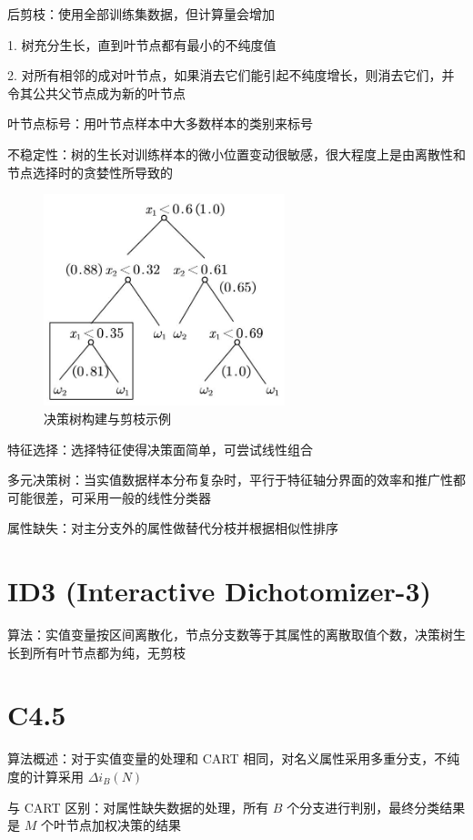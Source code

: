 \documentclass[openany]{ctexbook}
\theoremstyle{kaiti}
\theoremstyle{normal}
\begin{document}
后剪枝：使用全部训练集数据，但计算量会增加

1. 树充分生长，直到叶节点都有最小的不纯度值

2. 对所有相邻的成对叶节点，如果消去它们能引起不纯度增长，则消去它们，并令其公共父节点成为新的叶节点

叶节点标号：用叶节点样本中大多数样本的类别来标号

不稳定性：树的生长对训练样本的微小位置变动很敏感，很大程度上是由离散性和节点选择时的贪婪性所导致的

\begin{figure}
  \centering
  \includegraphics[width=7cm]{1627808769097-11.2(1).jpg}
  \caption{决策树构建与剪枝示例}
\end{figure}

特征选择：选择特征使得决策面简单，可尝试线性组合

多元决策树：当实值数据样本分布复杂时，平行于特征轴分界面的效率和推广性都可能很差，可采用一般的线性分类器

属性缺失：对主分支外的属性做替代分枝并根据相似性排序

\section{ID3 (Interactive Dichotomizer-3)}

算法：实值变量按区间离散化，节点分支数等于其属性的离散取值个数，决策树生长到所有叶节点都为纯，无剪枝

\section{C4.5}

算法概述：对于实值变量的处理和 CART 相同，对名义属性采用多重分支，不纯度的计算采用 $\Delta i_B\left(N \right)$

与 CART 区别：对属性缺失数据的处理，所有 $B$ 个分支进行判别，最终分类结果是 $M$ 个叶节点加权决策的结果
\end{document}
